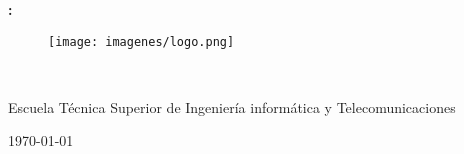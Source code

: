 \documentclass{memoria}
\begin{document}
\pagestyle{empty} %


\begin{center}
\LARGE{\bf \thetitle:}\\
\end{center}





\begin{figure}[H]
\centering
\texttt{[image: imagenes/logo.png]}
\end{figure}


\begin{center}
\theauthor
\\
\end{center}

\begin{center}
Escuela Técnica Superior de Ingeniería informática y Telecomunicaciones

\end{center}


\begin{center}
\today
\end{center}


\newpage

\pagestyle{plain} %
\tableofcontents




\newpage

%
%



\nocite{*}

%
\end{document}

